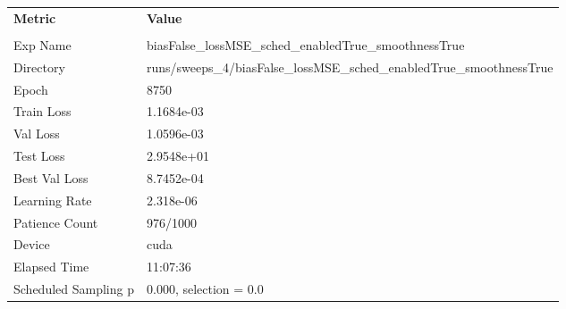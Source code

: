 \begin{tabular}{|l|l|}
\hline
\textbf{Metric} & \textbf{Value} \\\\
Exp Name & biasFalse_lossMSE_sched_enabledTrue_smoothnessTrue \\ 
Directory & runs/sweeps_4/biasFalse_lossMSE_sched_enabledTrue_smoothnessTrue \\ 
Epoch & 8750 \\ 
Train Loss & 1.1684e-03 \\ 
Val Loss & 1.0596e-03 \\ 
Test Loss & 2.9548e+01 \\ 
Best Val Loss & 8.7452e-04 \\ 
Learning Rate & 2.318e-06 \\ 
Patience Count & 976/1000 \\ 
Device & cuda \\ 
Elapsed Time & 11:07:36 \\ 
Scheduled Sampling p & 0.000, selection = 0.0 \\ 
\hline
\end{tabular}